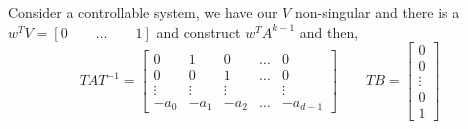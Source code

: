 Consider a controllable system, we have our $V$ non-singular and there is a $w^TV = [0 \qquad \dots \qquad 1]$ and construct $w^TA^{k-1}$ and then,
$$ TAT^{-1} = \begin{bmatrix}
  0 & 1 & 0 & \dots & 0\\
  0 & 0 & 1 & \dots & 0\\
  \vdots & \vdots &\vdots && \vdots\\
  -a_0 & -a_1 & -a_2 & \dots & -a_{d-1}
\end{bmatrix} \qquad TB = \begin{bmatrix}
  0 \\ 0 \\ \vdots \\ 0 \\ 1
\end{bmatrix}$$
